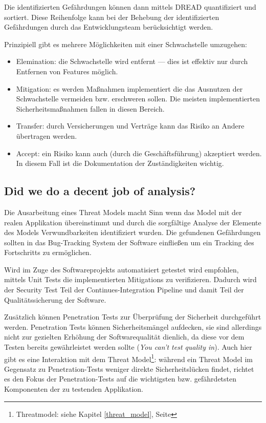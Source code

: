 Die identifizierten Gefährdungen können dann mittels DREAD quantifiziert und sortiert. Diese Reihenfolge kann bei der Behebung der identifizierten Gefährdungen durch das Entwicklungsteam berücksichtigt werden.

Prinzipiell gibt es mehrere Möglichkeiten mit einer Schwachstelle umzugehen:

\begin{itemize}
	\item Elemination: die Schwachstelle wird entfernt --- dies ist effektiv nur durch Entfernen von Features möglich.
	\item Mitigation: es werden Maßnahmen implementiert die das Ausnutzen der Schwachstelle vermeiden bzw. erschweren sollen. Die meisten implementierten Sicherheitsmaßnahmen fallen in diesen Bereich.
	\item Transfer: durch Versicherungen und Verträge kann das Risiko an Andere übertragen werden.
	\item Accept: ein Risiko kann auch (durch die Geschäftsführung) akzeptiert werden. In diesem Fall ist die Dokumentation der Zuständigkeiten wichtig.
\end{itemize}

\subsection{Did we do a decent job of analysis?}

Die Ausarbeitung eines Threat Models macht Sinn wenn das Model mit der realen Applikation übereinstimmt und durch die sorgfältige Analyse der Elemente des Models Verwundbarkeiten identifiziert wurden. Die gefundenen Gefährdungen sollten in das Bug-Tracking System der Software einfließen um ein Tracking des Fortschritts zu ermöglichen.

Wird im Zuge des Softwareprojekts automatisiert getestet wird empfohlen, mittels Unit Tests die implementierten Mitigations zu verifizieren. Dadurch wird der Security Test Teil der Continues-Integration Pipeline und damit Teil der Qualitätssicherung der Software.

Zusätzlich können Penetration Tests zur Überprüfung der Sicherheit durchgeführt werden. Penetration Tests können Sicherheitsmängel aufdecken, sie sind allerdings nicht zur gezielten Erhöhung der Softwarequalität dienlich, da diese vor dem Testen bereits gewährleistet werden sollte (\textit{You can't test quality in}). Auch hier gibt es eine Interaktion mit dem Threat Model\footnote{Threatmodel: siehe Kapitel \ref{threat_model}, Seite \pageref{threat_model}}: während ein Threat Model im Gegensatz zu Penetration-Tests weniger direkte Sicherheitslücken findet, richtet es den Fokus der Penetration-Tests auf die wichtigsten bzw. gefährdetsten Komponenten der zu testenden Applikation.

